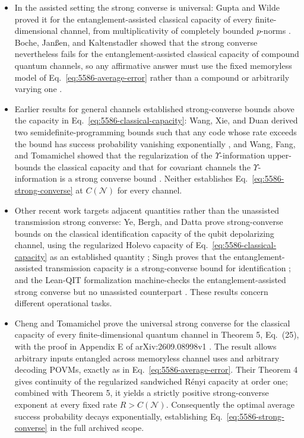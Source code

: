 \begin{itemize}
  \item In the assisted setting the strong converse is universal: Gupta and Wilde
  proved it for the entanglement-assisted classical capacity of every
  finite-dimensional channel, from multiplicativity of completely bounded
  $p$-norms .  Boche, Jan{\ss}en, and
  Kaltenstadler showed that the strong converse nevertheless fails for the
  entanglement-assisted classical capacity of compound quantum channels, so
  any affirmative answer must use the fixed memoryless model of
  Eq.~\eqref{eq:5586-average-error} rather than a compound or arbitrarily
  varying one .

  \item Earlier results for general channels established strong-converse
  bounds above the capacity in Eq.~\eqref{eq:5586-classical-capacity}: Wang,
  Xie, and Duan derived two semidefinite-programming bounds such that any
  code whose rate exceeds the bound has success probability vanishing
  exponentially , and Wang, Fang,
  and Tomamichel showed that the regularization of the $\Upsilon$-information
  upper-bounds the classical capacity and that for covariant channels the
  $\Upsilon$-information is a strong converse bound
  .  Neither establishes
  Eq.~\eqref{eq:5586-strong-converse} at $C(\mathcal N)$ for every channel.

  \item Other recent work targets adjacent quantities rather than
  the unassisted transmission strong converse: Ye, Bergh, and Datta prove
  strong-converse bounds on the classical identification capacity of the
  qubit depolarizing channel, using the regularized Holevo capacity of
  Eq.~\eqref{eq:5586-classical-capacity} as an established quantity
  ; Singh proves that the
  entanglement-assisted transmission capacity is a strong-converse bound for
  identification ; and the Lean-QIT
  formalization machine-checks the entanglement-assisted strong converse but
  no unassisted counterpart
  .  These results concern different operational tasks.

  \item Cheng and Tomamichel prove the universal strong converse for the classical
  capacity of every finite-dimensional quantum channel in Theorem 5,
  Eq.~(25), with the proof in Appendix E of arXiv:2609.08998v1
  .  The result allows arbitrary
  inputs entangled across memoryless channel uses and arbitrary decoding
  POVMs, exactly as in Eq.~\eqref{eq:5586-average-error}.  Their Theorem 4
  gives continuity of the regularized sandwiched R\'enyi capacity at order
  one; combined with Theorem 5, it yields a strictly positive strong-converse
  exponent at every fixed rate $R>C(\mathcal N)$.  Consequently the optimal
  average success probability decays exponentially, establishing
  Eq.~\eqref{eq:5586-strong-converse} in the full archived scope.
\end{itemize}

